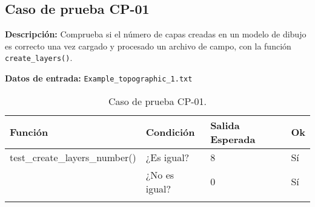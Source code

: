 \newpage
\subsection{Caso de prueba CP-01}

\textbf{Descripción:} Comprueba si el número de capas creadas en un modelo de dibujo es correcto una vez cargado y procesado un archivo de campo, con la función \texttt{create\_layers()}.

\textbf{Datos de entrada:} \texttt{Example\_topographic\_1.txt}


\begin{longtable}[]{@{}llll@{}}
\toprule
\begin{minipage}[b]{0.6\columnwidth}\raggedright\strut
Función\strut
\end{minipage} & \begin{minipage}[b]{0.20\columnwidth}\raggedright\strut
Condición\strut
\end{minipage} & \begin{minipage}[b]{0.15\columnwidth}\raggedright\strut
Salida Esperada\strut
\end{minipage} & \begin{minipage}[b]{0.05\columnwidth}\raggedright\strut
Ok\strut
\end{minipage}\tabularnewline
\midrule
\endhead
\begin{minipage}[t]{0.6\columnwidth}\raggedright\strut
\small{test\_create\_layers\_number()}\strut
\end{minipage} & \begin{minipage}[t]{0.20\columnwidth}\raggedright\strut
¿Es igual?\strut
\end{minipage} & \begin{minipage}[t]{0.15\columnwidth}\raggedright\strut
8\strut
\end{minipage} & \begin{minipage}[t]{0.05\columnwidth}\raggedright\strut
Sí\strut
\end{minipage}\tabularnewline
\begin{minipage}[t]{0.6\columnwidth}\raggedright\strut
\strut
\end{minipage} & \begin{minipage}[t]{0.20\columnwidth}\raggedright\strut
¿No es igual?\strut
\end{minipage} & \begin{minipage}[t]{0.15\columnwidth}\raggedright\strut
0\strut
\end{minipage} & \begin{minipage}[t]{0.05\columnwidth}\raggedright\strut
Sí\strut
\end{minipage}\tabularnewline

\bottomrule
\caption{Caso de prueba CP-01.}
\end{longtable}

